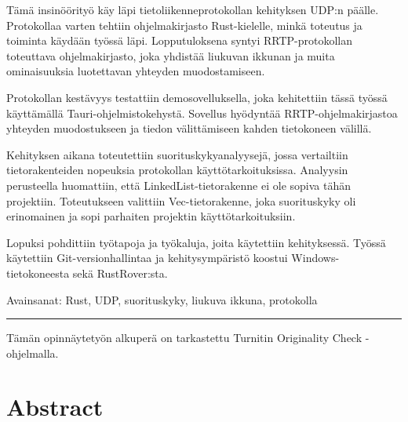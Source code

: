 \documentclass[a4paper,12pt]{article}
\newcommand*\sepline{
    \begin{center}
        \rule[1ex]{\textwidth}{.5pt}
    \end{center}}
\begin{document}
\begin{titlepage}
\begin{singlespace}
        Tämä insinöörityö käy läpi tietoliikenneprotokollan kehityksen UDP:n päälle. Protokollaa varten tehtiin ohjelmakirjasto Rust-kielelle, minkä toteutus ja toiminta käydään työssä läpi. Lopputuloksena syntyi RRTP-protokollan toteuttava ohjelmakirjasto, joka yhdistää liukuvan ikkunan ja muita ominaisuuksia luotettavan yhteyden muodostamiseen. \par

        Protokollan kestävyys testattiin demosovelluksella, joka kehitettiin tässä työssä käyttämällä Tauri-ohjelmistokehystä. Sovellus hyödyntää RRTP-ohjelmakirjastoa yhteyden muodostukseen ja tiedon välittämiseen kahden tietokoneen välillä. \par

        Kehityksen aikana toteutettiin suorituskykyanalyysejä, jossa vertailtiin tietorakenteiden nopeuksia protokollan käyttötarkoituksissa. Analyysin perusteella huomattiin, että LinkedList-tietorakenne ei ole sopiva tähän projektiin. Toteutukseen valittiin Vec-tietorakenne, joka suorituskyky oli erinomainen ja sopi parhaiten projektin käyttötarkoituksiin.\par

        Lopuksi pohdittiin työtapoja ja työkaluja, joita käytettiin kehityksessä. Työssä käytettiin Git-versionhallintaa ja kehitysympäristö koostui Windows-tietokoneesta sekä RustRover:sta. 
        
        \end{singlespace}
        
        \par
        Avainsanat: Rust, UDP, suorituskyky, liukuva ikkuna, protokolla 
        \sepline
        Tämän opinnäytetyön alkuperä on tarkastettu Turnitin Originality Check -ohjelmalla.
        
        \newpage
        
        \section*{Abstract}


\end{titlepage}
\end{document}
